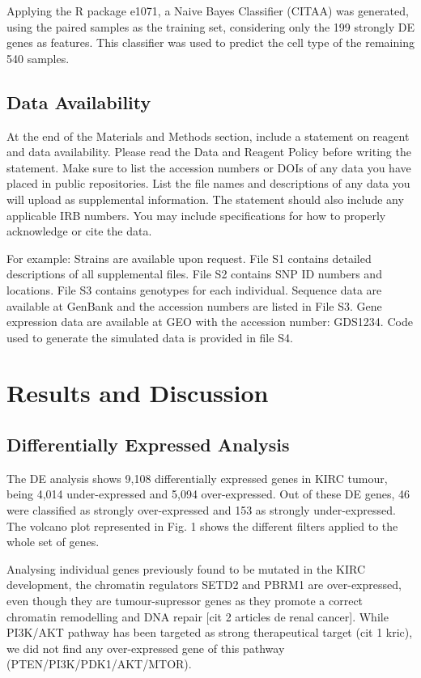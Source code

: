 \documentclass[9pt,twocolumn,twoside]{gsajnl}
\begin{document}
Applying the R package e1071, a Naive Bayes Classifier (CITAA) was generated, using the paired samples as the training set, considering only the 199 strongly DE genes as features. This classifier was used to predict the cell type of the remaining 540 samples. 

\subsection*{Data Availability}

At the end of the Materials and Methods section, include a statement on reagent and data availability. Please read the Data and Reagent Policy before writing the statement. Make sure to list the accession numbers or DOIs of any data you have placed in public repositories. List the file names and descriptions of any data you will upload as supplemental information. The statement should also include any applicable IRB numbers. You may include specifications for how to properly acknowledge or cite the data.

For example: Strains are available upon request. File S1 contains detailed descriptions of all supplemental files. File S2 contains SNP ID numbers and locations. File S3 contains genotypes for each individual. Sequence data are available at GenBank and the accession numbers are listed in File S3. Gene expression data are available at GEO with the accession number: GDS1234. Code used to generate the simulated data is provided in file S4. 


\section*{Results and Discussion}
\subsection*{Differentially Expressed Analysis}
The DE analysis shows 9,108 differentially expressed genes in KIRC tumour, being 4,014 under-expressed and 5,094 over-expressed. Out of these DE genes, 46 were classified as strongly over-expressed and 153 as strongly under-expressed. The volcano plot represented in Fig. 1 shows the different filters applied to the whole set of genes.

Analysing individual genes previously found to be mutated in the KIRC development, the chromatin regulators SETD2 and PBRM1 are over-expressed, even though they are tumour-supressor genes as they promote a correct chromatin remodelling and DNA repair [cit 2 articles de renal cancer]. While PI3K/AKT pathway has been targeted as strong therapeutical target (cit 1 kric), we did not find any over-expressed gene of this pathway (PTEN/PI3K/PDK1/AKT/MTOR).
\end{document}

